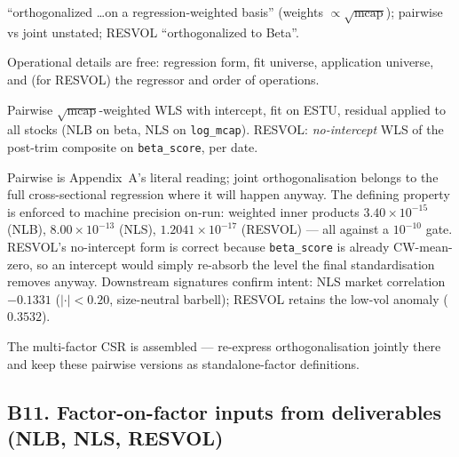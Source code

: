 \documentclass[11pt,a4paper]{article}
\begin{document}
\begin{description}[style=nextline]
  \item[USE4] ``orthogonalized \ldots on a regression-weighted basis''
    (weights $\propto \sqrt{\text{mcap}}$); pairwise vs joint unstated;
    RESVOL ``orthogonalized to Beta''.
  \item[Deviation] Operational details are free: regression form, fit
    universe, application universe, and (for RESVOL) the regressor and order
    of operations.
  \item[Solution] Pairwise $\sqrt{\text{mcap}}$-weighted WLS with intercept,
    fit on ESTU, residual applied to all stocks (NLB on beta, NLS on
    \texttt{log\_mcap}). RESVOL: \emph{no-intercept} WLS of the post-trim
    composite on \texttt{beta\_score}, per date.
  \item[Validity] Pairwise is Appendix~A's literal reading; joint
    orthogonalisation belongs to the full cross-sectional regression where it
    will happen anyway. The defining property is enforced to machine
    precision on-run: weighted inner products $3.40\times10^{-15}$ (NLB),
    $8.00\times10^{-13}$ (NLS), $1.2041\times10^{-17}$ (RESVOL) --- all
    against a $10^{-10}$ gate. RESVOL's no-intercept form is correct because
    \texttt{beta\_score} is already CW-mean-zero, so an intercept would simply
    re-absorb the level the final standardisation removes anyway. Downstream
    signatures confirm intent: NLS market correlation $-0.1331$
    ($|\cdot|<0.20$, size-neutral barbell); RESVOL retains the low-vol anomaly
    ($0.3532$).
  \item[Revisit when] The multi-factor CSR is assembled --- re-express
    orthogonalisation jointly there and keep these pairwise versions as
    standalone-factor definitions.
\end{description}

\subsection{B11. Factor-on-factor inputs from deliverables (NLB, NLS, RESVOL)}
\end{document}
